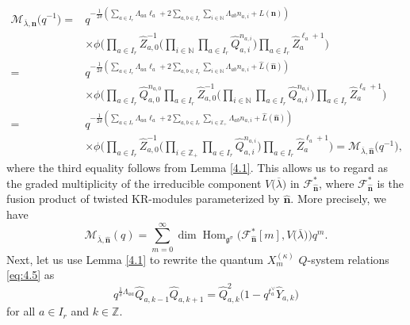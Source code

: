 \documentclass[pdftex]{sigma}
\numberwithin{equation}{section}
\DeclareMathOperator{\Hom}{Hom}
\begin{document}
\begin{align*}
\mathcal{M}_{\overline{\lambda},\mathbf{n}}\bigl(q^{-1}\bigr)
={}&q^{-\frac{1}{2\delta}(\sum_{a\in I_r}\Lambda_{aa}\ell_a+2\sum_{a,b\in I_r}\sum_{i\in\mathbb{N}}\Lambda_{ab}n_{a,i}+L( \mathbf{n}))}\\
&\times\phi\biggl(\prod_{a\in I_r}\widehat{Z}_{ a,0} ^{-1}\biggl(\prod_{i\in\mathbb{N}}\prod_{a\in I_r}\widehat{Q}_{ a,i}^{n_{a,i}}\biggr)\prod_{a\in I_r}\widehat{Z}_a^{\ell_a+1}\biggr)\\
={}&q^{-\frac{1}{2\delta}(\sum_{a\in I_r}\Lambda_{aa}\ell_a+2\sum_{a,b\in I_r}\sum_{i\in\mathbb{N}}\Lambda_{ab}n_{a,i}+\widehat{L}(\widehat{\mathbf{n}}))}\\
&\times\phi\biggl(\prod_{a\in I_r}\widehat{Q}_{a,0}^{n_{a,0}}\prod_{a\in I_r}\widehat{Z}_{ a,0} ^{-1}\biggl(\prod_{i\in\mathbb{N}}\prod_{a\in I_r} \widehat{Q}_{a,i}^{n_{a,i}}\biggr)\prod_{a\in I_r}\widehat{ Z}_a^{\ell_a+1}\biggr)\\
={}&q^{-\frac{1}{2\delta}(\sum_{a\in I_r}\Lambda_{aa}\ell_a+2\sum_{a,b\in I_r}\sum_{i\in\mathbb{Z}_+}\Lambda_{ab}n_{a,i}+\widehat{L}(\widehat{\mathbf{n}}))}\\
&\times\phi\biggl(\prod_{a\in I_r}\widehat{Z}_{a,0}^{-1}\biggl(\prod_{i\in\mathbb{Z}_+}\prod_{a\in I_r} \widehat{Q}_{a,i}^{n_{a,i}}\biggr)\prod_{a\in I_r}\widehat{ Z}_a^{\ell_a+1}\biggr)
=\mathcal{M}_{\overline{\lambda},\widehat{\mathbf{n}}}\bigl(q^{-1}\bigr),
\end{align*}
where the third equality follows from Lemma \ref{4.1}. This allows us to regard  as the graded multiplicity of the irreducible component $V\bigl(\overline{\lambda}\bigr)$ in $\mathcal{F}_{\widehat{\mathbf{n}}}^*$, where $\mathcal{F}_{\widehat{\mathbf{n}}}^*$ is the fusion product of twisted KR-modules parameterized by $\widehat{\mathbf{n}}$. More precisely, we have
\begin{equation*}
\mathcal{M}_{\overline{\lambda},\widehat{\mathbf{n}}}(q)
=\sum_{m=0}^{\infty}\dim\Hom_{\mathfrak{g}^{\sigma}}\bigl(\mathcal{ F}_{\widehat{\mathbf{n}}}^*[m],V\bigl(\overline{\lambda}\bigr)\bigr)q^m.
\end{equation*}
Next, let us use Lemma \ref{4.1} to rewrite the quantum $X_m^{(\kappa)}$ $Q$-system relations \eqref{eq:4.5} as
\begin{equation}\label{eq:5.4}
q^{\frac{1}{\delta}\Lambda_{aa}}\widehat{Q}_{a,k-1} \widehat{Q}_{a,k+1}= \widehat{Q}_{a,k}^2\bigl(1-q^{t_a^{\vee}}\widehat{Y}_{a,k}\bigr)
\end{equation}
for all $a\in I_r$ and $k\in\mathbb{Z}$.
\end{document}
